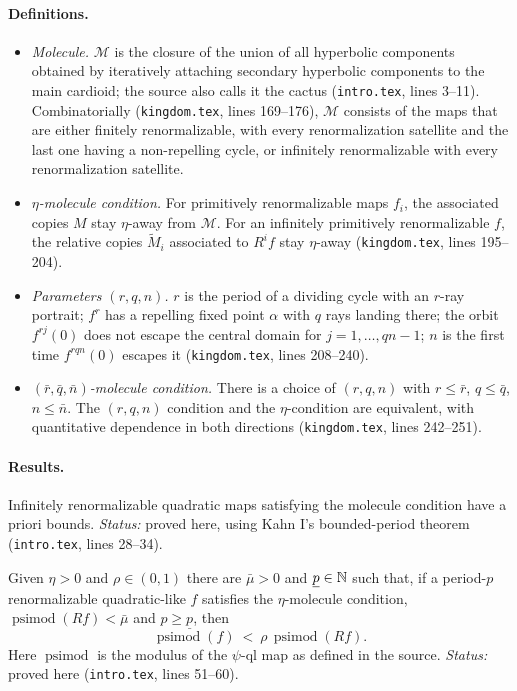 \paragraph{Definitions.}
\begin{itemize}
\item \emph{Molecule.} $\mathcal M$ is the closure of the union of all hyperbolic components
obtained by iteratively attaching secondary hyperbolic components to the main cardioid; the
source also calls it the cactus (\texttt{intro.tex}, lines 3--11).  Combinatorially (\texttt{kingdom.tex}, lines 169--176), $\mathcal M$ consists of the maps that
are either finitely renormalizable, with every renormalization satellite and the last one having a
non-repelling cycle, or infinitely renormalizable with every renormalization satellite.
\item \emph{$\eta$-molecule condition.} For primitively renormalizable maps $f_i$, the associated
copies $M$ stay $\eta$-away from $\mathcal M$.  For an infinitely primitively renormalizable $f$, the
relative copies $\widetilde M_i$ associated to $R^if$ stay $\eta$-away
(\texttt{kingdom.tex}, lines 195--204).
\item \emph{Parameters $(r,q,n)$.} $r$ is the period of a dividing cycle with an $r$-ray portrait;
$f^r$ has a repelling fixed point $\alpha$ with $q$ rays landing there; the orbit $f^{rj}(0)$ does
not escape the central domain for $j=1,\dots,qn-1$; $n$ is the first time $f^{rqn}(0)$ escapes it
(\texttt{kingdom.tex}, lines 208--240).
\item \emph{$(\bar r,\bar q,\bar n)$-molecule condition.} There is a choice of $(r,q,n)$ with
$r\le\bar r$, $q\le\bar q$, $n\le\bar n$.  The $(r,q,n)$ condition and the $\eta$-condition are
equivalent, with quantitative dependence in both directions (\texttt{kingdom.tex}, lines 242--251).
\end{itemize}

\paragraph{Results.}

\begin{theorem}
\label{thm:kahn-III-main}
Infinitely renormalizable quadratic maps satisfying the molecule condition have a priori bounds.
\emph{Status:} proved here, using Kahn I's bounded-period theorem (\texttt{intro.tex}, lines 28--34).
\end{theorem}

\begin{theorem}
\label{thm:kahn-III-high}
Given $\eta>0$ and $\rho\in(0,1)$ there are $\bar\mu>0$ and $\underline p\in\mathbb N$ such that, if a
period-$p$ renormalizable quadratic-like $f$ satisfies the $\eta$-molecule condition,
$\operatorname{psimod}(Rf)<\bar\mu$ and $p\ge\underline p$, then
\[
\operatorname{psimod}(f)\ <\ \rho\,\operatorname{psimod}(Rf).
\]
Here $\operatorname{psimod}$ is the modulus of the $\psi$-ql map as defined in the source.
\emph{Status:} proved here (\texttt{intro.tex}, lines 51--60).
\end{theorem}

